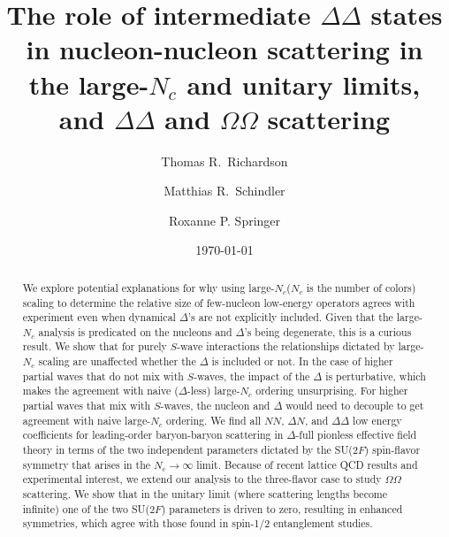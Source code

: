 \documentclass[nofootinbib, preprint, aps, prc, superscriptaddress,11pt]{revtex4-1}
\newcommand{\Nc}{\ensuremath{N_c}\xspace}
\newcommand{\NN}{\ensuremath{N\!N}\xspace}
\newcommand{\1}{\mathbbm{1}}
\newcommand{\D}{\ensuremath{\Delta}\xspace}
\newcommand{\DD}{\ensuremath{\Delta\Delta}\xspace}
\newcommand{\DN}{\ensuremath{\Delta N}\xspace}
\newcommand{\OO}{\ensuremath{\Omega\Omega}\xspace}
\begin{document}
\title{The role of intermediate \DD states in nucleon-nucleon scattering in the large-\Nc and unitary limits, and \DD and \OO scattering}


\author{Thomas R.~Richardson}
\author{Matthias R.~Schindler}
\author{Roxanne P. Springer}



\date{\today}



\begin{abstract}


We explore potential explanations for why using large-\Nc (\Nc is the number of colors) scaling to determine the relative size of few-nucleon low-energy operators agrees with experiment even when dynamical \D's are not explicitly included. 
Given that the large-\Nc analysis is predicated on the nucleons and \D's being degenerate, this is a curious result.  
We show that for purely $S$-wave interactions the relationships dictated by large-\Nc scaling are unaffected whether the \D is included or not.
In the case of higher partial waves that do not mix with $S$-waves, the impact of the  \D is perturbative, which makes the  agreement with  naive (\D-less) large-\Nc ordering unsurprising. 
For higher partial waves that mix with $S$-waves, the nucleon and \D would need to decouple to get agreement with naive large-\Nc ordering.
We find all \NN, \DN, and \DD low energy coefficients for leading-order baryon-baryon scattering in \D-full pionless effective field theory in terms of the two independent parameters dictated by the SU($2F$) spin-flavor symmetry that arises in the \Nc $\rightarrow \infty$ limit.  
Because of recent lattice QCD results and experimental interest, we extend our analysis to the three-flavor case to study $\OO$ scattering.
We show that in the unitary limit (where scattering lengths become infinite) one of the two SU($2F$) parameters is driven to zero, resulting in enhanced symmetries, which agree with those found in spin-1/2 entanglement studies.



\end{abstract}
\end{document}
